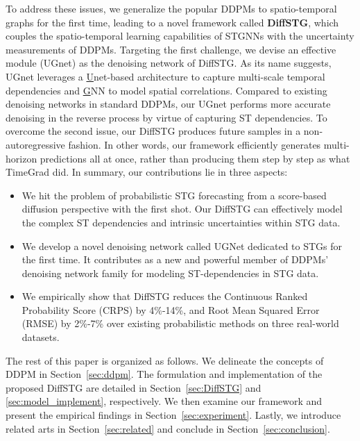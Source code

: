 {\par To address these issues, we generalize the popular DDPMs to spatio-temporal graphs for the first time, leading to a novel framework called \textbf{DiffSTG}, which couples the spatio-temporal learning capabilities of STGNNs with the uncertainty measurements of DDPMs. Targeting the first challenge, we devise an effective module (UGnet) as the denoising network of DiffSTG. As its name suggests, UGnet leverages a \underline{U}net-based architecture \cite{ronneberger2015u} to capture multi-scale temporal dependencies and \underline{G}NN to model spatial correlations. Compared to existing denoising networks in standard DDPMs, our UGnet performs more accurate denoising in the reverse process by virtue of capturing ST dependencies. To overcome the second issue, our DiffSTG produces future samples in a non-autoregressive fashion. In other words, our framework efficiently generates multi-horizon predictions all at once, rather than producing them step by step as what TimeGrad did. In summary, our contributions lie in three aspects:
\begin{itemize}[leftmargin=*]
    \item We hit the problem of probabilistic STG forecasting from a score-based diffusion perspective with the first shot. Our DiffSTG can effectively model the complex ST dependencies and intrinsic uncertainties within STG data.

    \item We develop a novel denoising network called UGNet dedicated to STGs for the first time. It contributes as a new and powerful member of DDPMs' denoising network family for modeling ST-dependencies in STG data.
    

    \item We empirically show that DiffSTG reduces the Continuous Ranked Probability Score (CRPS) by 4\%-14\%, and Root Mean Squared Error (RMSE) by 2\%-7\% over existing probabilistic methods on three real-world datasets.

\end{itemize}

\par The rest of this paper is organized as follows. We delineate the concepts of DDPM in Section~\ref{sec:ddpm}. The formulation and implementation of the proposed DiffSTG are detailed in Section~\ref{sec:DiffSTG} and \ref{sec:model_implement}, respectively. We then examine our framework and present the empirical findings in Section~\ref{sec:experiment}. Lastly, we introduce related arts in Section~\ref{sec:related} and conclude in Section~\ref{sec:conclusion}.

}
